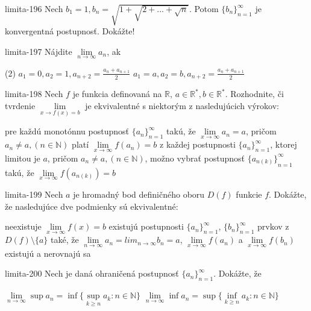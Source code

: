 \begin{defproblem}{limita-196}
Nech $b_1=1,b_n=\sqrt{1+\sqrt{2+...+\sqrt{n}}}$. Potom ${\{b_n\}}_{n=1}^\infty$ je konvergentná postupnosť. Dokážte!
\end{defproblem}

\begin{defproblem}{limita-197}
Nájdite $\lim\limits_{n \rightarrow \infty} a_n$, ak
\begin{tasks}(2)
    \task $a_1=0,a_2=1,a_{n+2}=\frac{a_n+a_{n+1}}{2}$
    \task $a_1=a,a_2=b,a_{n+2}=\frac{a_n+a_{n+1}}{2}$
\end{tasks}
\end{defproblem}

\begin{defproblem}{limita-198}
Nech $f$ je funkcia definovaná na $\mathbb{R}$, $a \in \mathbb{R^*},b \in
\mathbb{R^*}$. Rozhodnite, či tvrdenie $\lim\limits_{x \rightarrow f(x)=b}$ je
ekvivalentné s niektorým z nasledujúcich výrokov:
\begin{tasks}
\task
    pre každú monotónnu postupnosť ${\{a_n\}}_{n=1}^\infty$ takú, že
    $\lim\limits_{x \rightarrow \infty} a_n=a$, pričom $a_n \neq a,(n \in
    \mathbb{N})$ platí $\lim\limits_{x \rightarrow \infty} f(a_n)=b$
\task
    z každej postupnosti ${\{a_n\}}_{n=1}^\infty$, ktorej limitou je $a$, pričom
    $a_n \neq a ,(n \in \mathbb{N})$, možno vybrať postupnosť
    ${\{a_{n(k)}\}}_{n=1}^\infty$ takú, že $\lim\limits_{x \rightarrow \infty}
    f(a_{n(k)})=b$
\end{tasks}
\end{defproblem}

\begin{defproblem}{limita-199}
Nech $a$ je hromadný bod definičného oboru $D(f)$ funkcie $f$. Dokážte, že
nasledujúce dve podmienky sú ekvivalentné:
\begin{tasks}
\task
    neexistuje $\lim\limits_{x \rightarrow \infty} f(x)=b$
\task
    existujú postupnosti ${\{a_n\}}_{n=1}^\infty$, ${\{b_n\}}_{n=1}^\infty$
    prvkov z $D(f) \setminus \{a \}$ také, že $\lim\limits_{n \rightarrow
    \infty} a_n=lim_{n \rightarrow \infty} b_n=a$, $\lim\limits_{x \rightarrow
    \infty} f(a_n)$ a $\lim\limits_{x \rightarrow \infty} f(b_n)$ existujú a
    nerovnajú sa
\end{tasks}
\end{defproblem}

\begin{defproblem}{limita-200}
Nech je daná ohraničená postupnosť ${\{a_n\}}_{n=1}^\infty$. Dokážte, že
\begin{tasks}
    \task
        $\lim\limits_{n \rightarrow \infty}
            \sup a_n=\inf \{\sup\limits_{k \geq n} a_k: n \in \mathbb{N}\}$
    \task
        $\lim\limits_{n \rightarrow \infty}
            \inf a_n= \sup \{\inf\limits_{k \geq n} a_k: n \in \mathbb{N}\}$
\end{tasks}
\end{defproblem}

